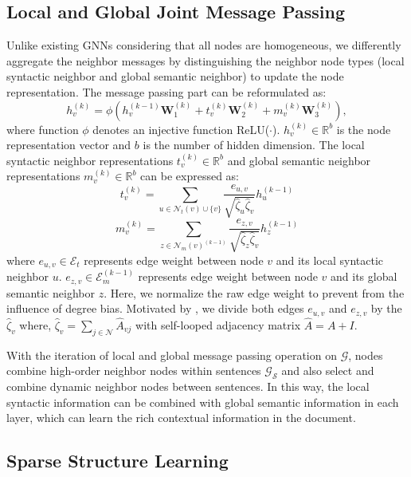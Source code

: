 \documentclass[letterpaper]{article} %
\begin{document}
\subsection{Local and Global Joint Message Passing }
Unlike existing GNNs considering that all nodes are homogeneous, we differently aggregate the neighbor messages by distinguishing the neighbor node types (local syntactic neighbor and global semantic neighbor) to update the node representation. The message passing part can be reformulated as:
\begin{equation}
h_{v}^{(k)}=\phi\left(h_{v}^{(k-1)}\mathbf{W}_1^{(k)}+t_{v}^{(k)}\mathbf{W}_2^{(k)}+m_v^{(k)}\mathbf{W}_3^{(k)}\right),
\end{equation}
where function $\phi$ denotes an injective function ReLU(\(\cdot\)). \(h_{v}^{(k)}\in\mathbb{R}^{b}\) is the node representation vector and $b$ is the number of hidden dimension. The local syntactic neighbor representations $t_{v}^{(k)}\in\mathbb{R}^{b}$ and global semantic neighbor representations $m_{v}^{(k)}\in\mathbb{R}^{b}$ can be expressed as:
\begin{equation}
{t}_{v}^{(k)} =\sum_{u\in{\mathcal{N}_t(v)\cup{\{v\}}}}\frac{e_{u,v}}{\sqrt{\hat{\zeta}_u\hat{\zeta}_v}}h_{u}^{(k-1)}
\end{equation}
\begin{equation}
m_{v}^{(k)}=\sum_{z\in{{\mathcal{N}_m(v)}}^{(k-1)}}\frac{e_{z,v}}{\sqrt{\hat{\zeta}_z\hat{\zeta}_v}}h_{z}^{(k-1)}
\end{equation}
where \(e_{u,v}\in\mathcal{E}_t\) represents edge weight between node $v$ and its local syntactic neighbor $u$. \(e_{z,v}\in\mathcal{E}^{(k-1)}_m\) represents edge weight between node $v$ and its global semantic neighbor $z$.
Here, we normalize the raw edge weight to prevent from the influence of degree bias. Motivated by \citet{kipf2017semi}, we divide both edges $e_{u,v}$ and $e_{z,v}$  by the $\hat{\zeta}_v$ where, $\hat{\zeta}_{v}=\sum_{j\in\mathcal{N}}\hat{A}_{vj}$ with self-looped adjacency matrix $\hat{A}=A+I$.

With the iteration of local and global message passing operation on $\mathcal{G}$, nodes combine high-order neighbor nodes within sentences $\mathcal{G}_\mathcal{S}$ and also select and combine dynamic neighbor nodes between sentences. In this way, the local syntactic information can be combined with global semantic information in each layer, which can learn the rich contextual information in the document.

\subsection{Sparse Structure Learning}
\end{document}
